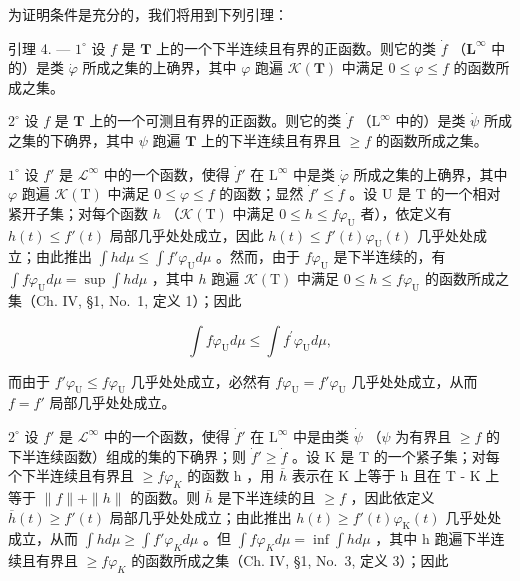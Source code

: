 为证明条件是充分的，我们将用到下列引理：

引理 4. --- \(1^{\circ}\) 设 \(f\) 是 \(\mathbf{T}\) 上的一个下半连续且有界的正函数。则它的类 \(\dot{f}\) （\(\mathbf{L}^{\infty}\) 中的）是类 \(\dot{\varphi}\) 所成之集的上确界，其中 \(\varphi\) 跑遍 \(\mathcal{K}(\mathbf{T})\) 中满足 \(0 \leqslant \varphi \leqslant f\) 的函数所成之集。

\(2^{\circ}\) 设 \(f\) 是 \(\mathbf{T}\) 上的一个可测且有界的正函数。则它的类 \(\dot{f}\) （\(\mathrm{L}^{\infty}\) 中的）是类 \(\dot{\psi}\) 所成之集的下确界，其中 \(\psi\) 跑遍 \(\mathbf{T}\) 上的下半连续且有界且 \(\geqslant f\) 的函数所成之集。

\(1^{\circ}\) 设 \(f'\) 是 \(\mathcal{L}^{\infty}\) 中的一个函数，使得 \(\dot{f}'\) 在 \(\mathrm{L}^{\infty}\) 中是类 \(\dot{\varphi}\) 所成之集的上确界，其中 \(\varphi\) 跑遍 \(\mathcal{K}(\mathrm{T})\) 中满足 \(0 \leqslant \varphi \leqslant f\) 的函数；显然 \(\dot{f}' \leqslant \dot{f}\) 。设 U 是 T 的一个相对紧开子集；对每个函数 \(h\) （\(\mathcal{K}(\mathrm{T})\) 中满足 \(0 \leqslant h \leqslant f\varphi_{\mathrm{U}}\) 者），依定义有 \(h(t) \leqslant f'(t)\) 局部几乎处处成立，因此 \(h(t) \leqslant f'(t)\varphi_{\mathrm{U}}(t)\) 几乎处处成立；由此推出 \(\int h d\mu \leqslant \int f'\varphi_{\mathrm{U}} d\mu\) 。然而，由于 \(f\varphi_{\mathrm{U}}\) 是下半连续的，有 \(\int f\varphi_{\mathrm{U}} d\mu = \sup \int h d\mu\) ，其中 \(h\) 跑遍 \(\mathcal{K}(\mathrm{T})\) 中满足 \(0 \leqslant h \leqslant f\varphi_{\mathrm{U}}\) 的函数所成之集（Ch. IV, §1, No.~1, 定义 1）；因此

\[
\int f \varphi_ {\mathrm{U}} d \mu \leqslant \int f ^ {\prime} \varphi_ {\mathrm{U}} d \mu ,
\]

而由于 \(f' \varphi_{\mathrm{U}} \leqslant f \varphi_{\mathrm{U}}\) 几乎处处成立，必然有 \(f \varphi_{\mathrm{U}} = f' \varphi_{\mathrm{U}}\) 几乎处处成立，从而 \(f = f'\) 局部几乎处处成立。

\(2^{\circ}\) 设 \(f'\) 是 \(\mathcal{L}^{\infty}\) 中的一个函数，使得 \(\dot{f}'\) 在 \(\mathrm{L}^{\infty}\) 中是由类 \(\dot{\psi}\) （\(\psi\) 为有界且 \(\geqslant f\) 的下半连续函数）组成的集的下确界；则 \(\dot{f}' \geqslant \dot{f}\) 。设 K 是 T 的一个紧子集；对每个下半连续且有界且 \(\geqslant f\varphi_{K}\) 的函数 h ，用 \(\overline{h}\) 表示在 K 上等于 h 且在 T - K 上等于 \(\|f\| + \|h\|\) 的函数。则 \(\overline{h}\) 是下半连续的且 \(\geqslant f\) ，因此依定义 \(\overline{h}(t) \geqslant f'(t)\) 局部几乎处处成立；由此推出 \(h(t) \geqslant f'(t)\varphi_{\mathrm{K}}(t)\) 几乎处处成立，从而 \(\int h d\mu \geqslant \int f'\varphi_{K} d\mu\) 。但 \(\int f\varphi_{K} d\mu = \inf \int h d\mu\) ，其中 h 跑遍下半连续且有界且 \(\geqslant f\varphi_{K}\) 的函数所成之集（Ch. IV, §1, No.~3, 定义 3）；因此

